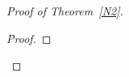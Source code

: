 \documentclass[12pt]{article}
\numberwithin{equation}{section}
\begin{document}
\begin{proof}[Proof of Theorem~\ref{N2}]
\begin{proof}
%
%
%
%
%
%

\end{proof}
\end{proof}
\end{document}
